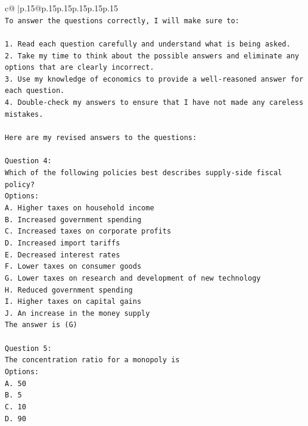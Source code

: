 \documentclass{article}
\begin{document}
{\begin{supertabular}{c@{$\;$}|p{.15\linewidth}@{}p{.15\linewidth}p{.15\linewidth}p{.15\linewidth}p{.15\linewidth}p{.15\linewidth}}
{{{\\ 
\texttt{To answer the questions correctly, I will make sure to:} \\
\\ 
\texttt{1. Read each question carefully and understand what is being asked.} \\
\texttt{2. Take my time to think about the possible answers and eliminate any options that are clearly incorrect.} \\
\texttt{3. Use my knowledge of economics to provide a well{-}reasoned answer for each question.} \\
\texttt{4. Double{-}check my answers to ensure that I have not made any careless mistakes.} \\
\\ 
\texttt{Here are my revised answers to the questions:} \\
\\ 
\texttt{Question 4:} \\
\texttt{Which of the following policies best describes supply{-}side fiscal policy?} \\
\texttt{Options:} \\
\texttt{A. Higher taxes on household income} \\
\texttt{B. Increased government spending} \\
\texttt{C. Increased taxes on corporate profits} \\
\texttt{D. Increased import tariffs} \\
\texttt{E. Decreased interest rates} \\
\texttt{F. Lower taxes on consumer goods} \\
\texttt{G. Lower taxes on research and development of new technology} \\
\texttt{H. Reduced government spending} \\
\texttt{I. Higher taxes on capital gains} \\
\texttt{J. An increase in the money supply} \\
\texttt{The answer is (G)} \\
\\ 
\texttt{Question 5:} \\
\texttt{The concentration ratio for a monopoly is} \\
\texttt{Options:} \\
\texttt{A. 50} \\
\texttt{B. 5} \\
\texttt{C. 10} \\
\texttt{D. 90} \\
}}}
\end{supertabular}}
\end{document}
